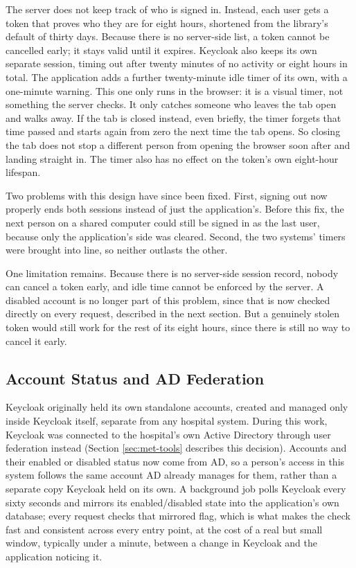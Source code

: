 The server does not keep track of who is signed in. Instead, each user gets a token that proves who they are for eight hours, shortened from the library's default of thirty days. Because there is no server-side list, a token cannot be cancelled early; it stays valid until it expires. Keycloak also keeps its own separate session, timing out after twenty minutes of no activity or eight hours in total. The application adds a further twenty-minute idle timer of its own, with a one-minute warning. This one only runs in the browser: it is a visual timer, not something the server checks. It only catches someone who leaves the tab open and walks away. If the tab is closed instead, even briefly, the timer forgets that time passed and starts again from zero the next time the tab opens. So closing the tab does not stop a different person from opening the browser soon after and landing straight in. The timer also has no effect on the token's own eight-hour lifespan.

Two problems with this design have since been fixed. First, signing out now properly ends both sessions instead of just the application's. Before this fix, the next person on a shared computer could still be signed in as the last user, because only the application's side was cleared. Second, the two systems' timers were brought into line, so neither outlasts the other.

One limitation remains. Because there is no server-side session record, nobody can cancel a token early, and idle time cannot be enforced by the server. A disabled account is no longer part of this problem, since that is now checked directly on every request, described in the next section. But a genuinely stolen token would still work for the rest of its eight hours, since there is still no way to cancel it early.

\subsection{Account Status and AD Federation}

Keycloak originally held its own standalone accounts, created and managed only inside Keycloak itself, separate from any hospital system. During this work, Keycloak was connected to the hospital's own Active Directory through user federation instead (Section \ref{sec:met-tools} describes this decision). Accounts and their enabled or disabled status now come from AD, so a person's access in this system follows the same account AD already manages for them, rather than a separate copy Keycloak held on its own. A background job polls Keycloak every sixty seconds and mirrors its enabled/disabled state into the application's own database; every request checks that mirrored flag, which is what makes the check fast and consistent across every entry point, at the cost of a real but small window, typically under a minute, between a change in Keycloak and the application noticing it.

